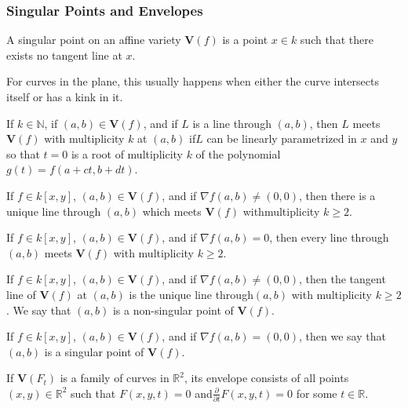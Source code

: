            \subsubsection{Singular Points and Envelopes}
                    \begin{definition}
                    A singular point on an affine variety $\mathbf{V}(f)$ is a point $x\in k$ such that there exists no tangent line at $x$.
                    \end{definition}
                    \begin{remark}
                    For curves in the plane, this usually happens when either the curve intersects itself or has a kink in it.
                    \end{remark}
                    \begin{definition}
                    If $k\in \mathbb{N}$, if $(a,b)\in \mathbf{V}(f)$, and if $L$ is a line through $(a,b)$, then $L$ meets $\mathbf{V}(f)$ with multiplicity $k$ at $(a,b)$ if$L$ can be linearly parametrized in $x$ and $y$ so that $t=0$ is a root of multiplicity $k$ of the polynomial $g(t) = f(a+ct,b+dt)$.
                    \end{definition}
                    \begin{theorem}
                    If $f\in k[x,y]$, $(a,b) \in \mathbf{V}(f)$, and if $\nabla f(a,b) \ne (0,0)$, then there is a unique line through $(a,b)$ which meets $\mathbf{V}(f)$ withmultiplicity $k\geq 2$.
                    \end{theorem}
                    \begin{theorem}
                    If $f\in k[x,y]$, $(a,b) \in \mathbf{V}(f)$, and if $\nabla f(a,b) = 0$, then every line through $(a,b)$ meets $\mathbf{V}(f)$ with multiplicity $k \geq 2$.
                    \end{theorem}
                    \begin{definition}
                    If $f\in k[x,y]$, $(a,b) \in \mathbf{V}(f)$, and if $\nabla f(a,b) \ne (0,0)$, then the tangent line of $\mathbf{V}(f)$ at $(a,b)$ is the unique line through$(a,b)$ with multiplicity $k\geq 2$. We say that $(a,b)$ is a non-singular point of $\mathbf{V}(f)$.
                    \end{definition}
                    \begin{definition}
                    If $f\in k[x,y]$, $(a,b) \in \mathbf{V}(f)$, and if $\nabla f(a,b) = (0,0)$, then we say that $(a,b)$ is a singular point of $\mathbf{V}(f)$.
                    \end{definition}
                    \begin{definition}
                    If $\mathbf{V}(F_t)$ is a family of curves in $\mathbb{R}^2$, its envelope consists of all points $(x,y) \in \mathbb{R}^2$ such that $F(x,y,t) = 0$ and$\frac{\partial}{\partial t}F(x,y,t) = 0$ for some $t\in \mathbb{R}$.
                    \end{definition}
